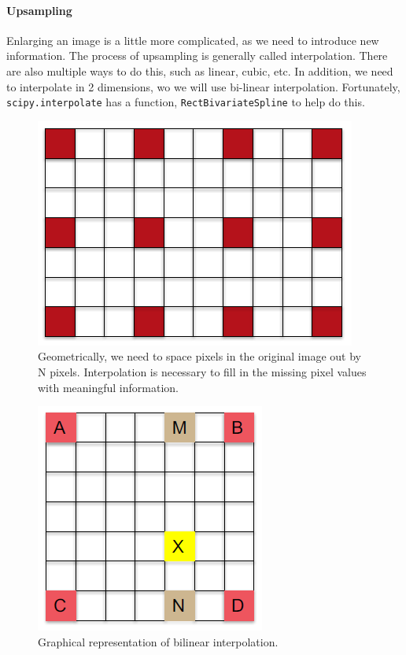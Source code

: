 \documentclass[11pt,a4paper]{article}
\begin{document}
\paragraph{Upsampling} Enlarging an image is a little more complicated, as we need to introduce new information. The process of upsampling is generally called interpolation. There are also multiple ways to do this, such as linear, cubic, etc. In addition, we need to interpolate in 2 dimensions, wo we will use bi-linear interpolation. Fortunately, \verb|scipy.interpolate| has a function, \verb|RectBivariateSpline| to help do this.

\begin{figure}[ht]
	\centering
	\includegraphics[scale=1]{figs/upsample}
	\caption{Geometrically, we need to space pixels in the original image out by N pixels. Interpolation is necessary to fill in the missing pixel values with meaningful information.}
	\label{fig:upsample_graphic}
\end{figure}

\begin{figure}[ht]
	\centering
	\includegraphics[scale=1.3]{figs/bilinear_interp}
	\caption{Graphical representation of bilinear interpolation.}
	\label{fig:bl_int}
\end{figure}
\end{document}
